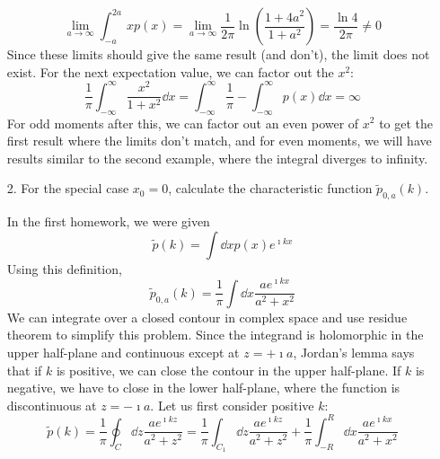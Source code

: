 \documentclass[a4paper,twoside]{article}
\begin{document}
\begin{itemize}
\begin{problem}
        \begin{equation}
            \lim_{a \to \infty} \int_{-a}^{2a} x p(x) = \lim_{a \to \infty} \frac{1}{2 \pi} \ln(\frac{1 + 4 a^2}{1 + a^2}) = \frac{\ln{4}}{2 \pi} \neq 0
        \end{equation}
        Since these limits should give the same result (and don't), the limit does not exist.
        For the next expectation value, we can factor out the $ x^2 $:
        \begin{equation}
            \frac{1}{\pi} \int_{- \infty}^{\infty} \frac{x^2}{1 + x^2} \dd{x} = \int_{- \infty}^{\infty} \frac{1}{\pi} - \int_{- \infty}^{\infty} p(x) \dd{x} = \infty
        \end{equation}
        For odd moments after this, we can factor out an even power of $ x^2 $ to get the first result where the limits don't match, and for even moments, we will have results similar to the second example, where the integral diverges to infinity.
    \end{problem}
    \item[2.] For the special case $ x_0 = 0 $, calculate the characteristic function $ \tilde{p}_{0,a}(k) $.
        \begin{problem}
            In the first homework, we were given
            \begin{equation}
                \tilde{p}(k) = \int \dd{x} p(x) e^{\imath k x}
            \end{equation}
            Using this definition,
            \begin{equation}
                \tilde{p}_{0,a}(k) = \frac{1}{\pi} \int \dd{x} \frac{ae^{\imath k x}}{a^2 + x^2}
            \end{equation}
            We can integrate over a closed contour in complex space and use residue theorem to simplify this problem. Since the integrand is holomorphic in the upper half-plane and continuous except at $ z = +\imath a $, Jordan's lemma says that if $ k $ is positive, we can close the contour in the upper half-plane. If $ k $ is negative, we have to close in the lower half-plane, where the function is discontinuous at $ z = - \imath a $. Let us first consider positive $ k $:
            \begin{equation}
                \tilde{p}(k) = \frac{1}{\pi} \oint_{C} \dd{z} \frac{ae^{\imath k z}}{a^2 + z^2} = \frac{1}{\pi} \int_{C_1} \dd{z} \frac{ae^{\imath k z}}{a^2 + z^2} + \frac{1}{\pi} \int_{-R}^{R} \dd{x} \frac{ae^{\imath k x}}{a^2 + x^2}
            \end{equation}

\end{problem}
\end{itemize}
\end{document}
